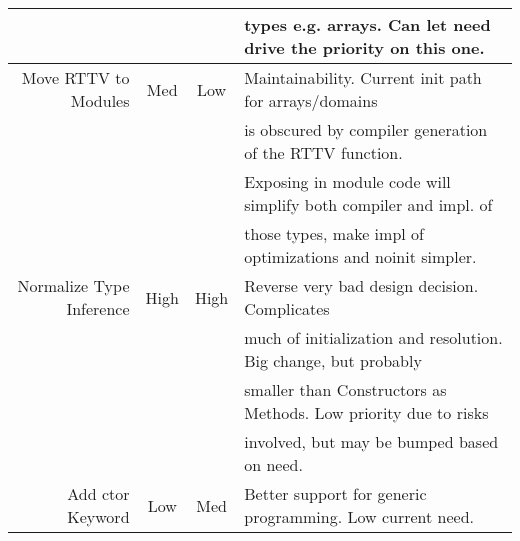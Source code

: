 \begin{tabular}{|r|c|c|l|}
 & & & types e.g. arrays. Can let need drive the priority on this one. \\ \hline
Move RTTV to Modules & Med & Low & Maintainability. Current init path for arrays/domains \\
 & & & is obscured by compiler generation of the RTTV function. \\
 & & & Exposing in module code will simplify both compiler and impl. of \\
 & & & those types, make impl of optimizations and noinit simpler. \\ \hline
Normalize Type Inference & High & High & Reverse very bad design decision. Complicates \\
 & & & much of initialization and resolution. Big change, but probably \\
 & & & smaller than Constructors as Methods. Low priority due to risks \\
 & & & involved, but may be bumped based on need. \\ \hline
Add ctor Keyword & Low & Med & Better support for generic programming.  Low current need. \\ \hline
\end{tabular}
